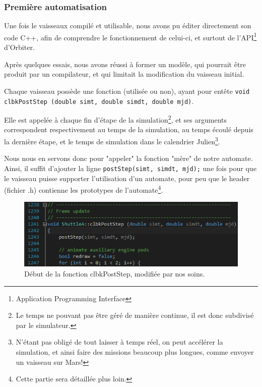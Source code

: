 \documentclass[a4paper,11pt]{article}
\begin{document}

    \subsubsection{Première automatisation}
        Une fois le vaisseaux compilé et utilisable, nous avons pu éditer directement son code C++, afin de comprendre le fonctionnement de celui-ci, et surtout de l'API\footnote{Application Programming Interface} d'Orbiter.

        Après quelques essais, nous avons réussi à former un modèle, qui pourrait être produit par un compilateur, et qui limitait la modification du vaisseau initial.
        
        Chaque vaisseau possède une fonction (utilisée ou non), ayant pour entête \texttt{void clbkPostStep (double simt, double simdt, double mjd)}. 
        
        Elle est appelée à chaque fin d'étape de la simulation\footnote{Le temps ne pouvant pas être géré de manière continue, il est donc subdivisé par le simulateur.}, et ses arguments correspondent respectivement au temps de la simulation, au temps écoulé depuis la dernière étape, et le temps de simulation dans le calendrier Julien\footnote{N'étant pas obligé de tout laisser à temps réel, on peut accélérer la simulation, et ainsi faire des missions beaucoup plus longues, comme envoyer un vaisseau sur Mars!}.
        
        Nous nous en servons donc pour "appeler" la fonction "mère" de notre automate. Ainsi, il suffit d'ajouter la ligne \texttt{postStep(simt, simdt, mjd);} une fois pour que le vaisseau puisse supporter l'utilisation d'un automate, pour peu que le header (fichier .h) contienne les prototypes de l'automate\footnote{Cette partie sera détaillée plus loin.}.
        
        \begin{figure}[!h]
            \begin{center}
                \includegraphics{img/post_step.png}
                \caption{Début de la fonction clbkPostStep, modifiée par nos soins.}
            \end{center}
        \end{figure}
        
\end{document}
